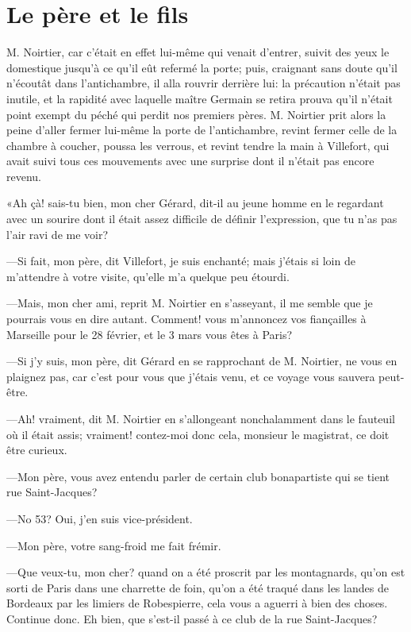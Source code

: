 \chapter{Le père et le fils}


\lettrine{M}{.} Noirtier, car c'était en effet lui-même qui venait d'entrer, suivit des yeux le domestique jusqu'à ce qu'il eût refermé la porte; puis, craignant sans doute qu'il n'écoutât dans l'antichambre, il alla rouvrir derrière lui: la précaution n'était pas inutile, et la rapidité avec laquelle maître Germain se retira prouva qu'il n'était point exempt du péché qui perdit nos premiers pères. M. Noirtier prit alors la peine d'aller fermer lui-même la porte de l'antichambre, revint fermer celle de la chambre à coucher, poussa les verrous, et revint tendre la main à Villefort, qui avait suivi tous ces mouvements avec une surprise dont il n'était pas encore revenu.

«Ah çà! sais-tu bien, mon cher Gérard, dit-il au jeune homme en le regardant avec un sourire dont il était assez difficile de définir l'expression, que tu n'as pas l'air ravi de me voir?

—Si fait, mon père, dit Villefort, je suis enchanté; mais j'étais si loin de m'attendre à votre visite, qu'elle m'a quelque peu étourdi.

—Mais, mon cher ami, reprit M. Noirtier en s'asseyant, il me semble que je pourrais vous en dire autant. Comment! vous m'annoncez vos fiançailles à Marseille pour le 28 février, et le 3 mars vous êtes à Paris?

—Si j'y suis, mon père, dit Gérard en se rapprochant de M. Noirtier, ne vous en plaignez pas, car c'est pour vous que j'étais venu, et ce voyage vous sauvera peut-être.

—Ah! vraiment, dit M. Noirtier en s'allongeant nonchalamment dans le fauteuil où il était assis; vraiment! contez-moi donc cela, monsieur le magistrat, ce doit être curieux.

—Mon père, vous avez entendu parler de certain club bonapartiste qui se tient rue Saint-Jacques?

—No 53? Oui, j'en suis vice-président.

—Mon père, votre sang-froid me fait frémir.

—Que veux-tu, mon cher? quand on a été proscrit par les montagnards, qu'on est sorti de Paris dans une charrette de foin, qu'on a été traqué dans les landes de Bordeaux par les limiers de Robespierre, cela vous a aguerri à bien des choses. Continue donc. Eh bien, que s'est-il passé à ce club de la rue Saint-Jacques?

